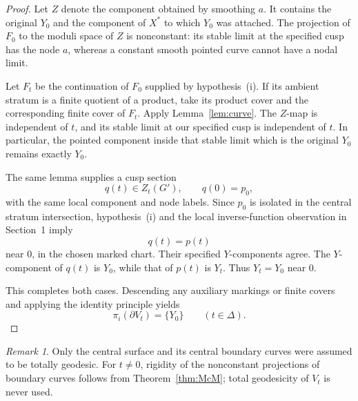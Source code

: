 \documentclass[11pt]{article}
\newcommand{\D}{\Delta}
\theoremstyle{remark}
\newtheorem{remark}[theorem]{Remark}
\begin{document}
\begin{proof}
Let \(Z\) denote the component obtained by smoothing \(a\).
It contains the original \(Y_0\) and the component of
\(X^\ast\) to which \(Y_0\) was attached.
The projection of \(F_0\) to the moduli space of \(Z\) is
nonconstant: its stable limit at the specified cusp has
the node \(a\), whereas a constant smooth pointed curve
cannot have a nodal limit.

Let \(F_t\) be the continuation of \(F_0\) supplied by
hypothesis~(i). If its ambient stratum is a finite quotient
of a product, take its product cover and the corresponding
finite cover of \(F_t\). Apply Lemma~\ref{lem:curve}.
The \(Z\)-map is independent of \(t\), and its stable limit
at our specified cusp is independent of \(t\).
In particular, the pointed component inside that stable
limit which is the original \(Y_0\) remains exactly \(Y_0\).

The same lemma supplies a cusp section
\[
q(t)\in Z_t(G'),
\qquad q(0)=p_0,
\]
with the same local component and node labels.
Since \(p_0\) is isolated in the central stratum intersection,
hypothesis~(i) and the local inverse-function observation in
Section~1 imply
\[
q(t)=p(t)
\]
near \(0\), in the chosen marked chart.
Their specified \(Y\)-components agree. The \(Y\)-component
of \(q(t)\) is \(Y_0\), while that of \(p(t)\) is \(Y_t\).
Thus \(Y_t=Y_0\) near \(0\).

This completes both cases. Descending any auxiliary markings
or finite covers and applying the identity principle yields
\[
\pi_i(\partial V_t)=\{Y_0\}
\qquad(t\in\D).
\]
\end{proof}

\begin{remark}
Only the central surface and its central boundary curves were
assumed to be totally geodesic. For \(t\ne0\), rigidity of the
nonconstant projections of boundary curves follows from
Theorem~\ref{thm:McM}; total geodesicity of \(V_t\) is never
used.
\end{remark}
\end{document}
